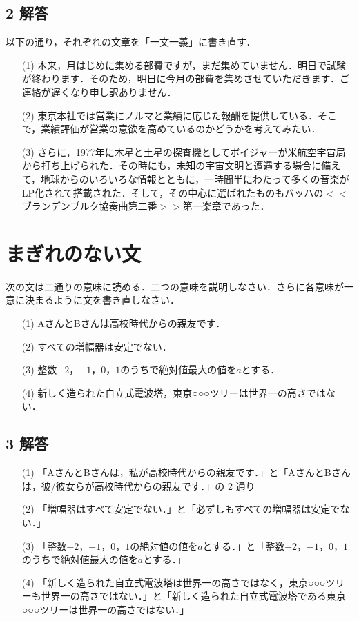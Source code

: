 \documentclass[11pt, a4paper]{jsarticle}
\begin{document}
\subsection*{2 解答}

以下の通り，それぞれの文章を「一文一義」に書き直す．

\begin{itemize}
    \item[(1)] 本来，月はじめに集める部費ですが，まだ集めていません．明日で試験が終わります．そのため，明日に今月の部費を集めさせていただきます．ご連絡が遅くなり申し訳ありません．
    \item[(2)] 東京本社では営業にノルマと業績に応じた報酬を提供している．そこで，業績評価が営業の意欲を高めているのかどうかを考えてみたい．
    \item[(3)] さらに，1977年に木星と土星の探査機としてボイジャーが米航空宇宙局から打ち上げられた．その時にも，未知の宇宙文明と遭遇する場合に備えて，地球からのいろいろな情報とともに，一時間半にわたって多くの音楽がLP化されて搭載された．そして，その中心に選ばれたものもバッハの$<<$ブランデンブルク協奏曲第二番$>>$第一楽章であった．
\end{itemize}

\newpage
\section{まぎれのない文}
次の文は二通りの意味に読める．二つの意味を説明しなさい．さらに各意味が一意に決まるように文を書き直しなさい．
\begin{itemize}
    \item[(1)] AさんとBさんは高校時代からの親友です．
    \item[(2)] すべての増幅器は安定でない．
    \item[(3)] 整数$-2$，$-1$，$0$，$1$のうちで絶対値最大の値を$a$とする．
    \item[(4)] 新しく造られた自立式電波塔，東京○○○ツリーは世界一の高さではない．
\end{itemize}
\subsection*{3 解答}

\begin{itemize}
    \item[(1)] 「AさんとBさんは，私が高校時代からの親友です．」と「AさんとBさんは，彼/彼女らが高校時代からの親友です．」の 2 通り
    \item[(2)] 「増幅器はすべて安定でない．」と「必ずしもすべての増幅器は安定でない．」
    \item[(3)] 「整数$-2$，$-1$，$0$，$1$の絶対値の値を$a$とする．」と「整数$-2$，$-1$，$0$，$1$のうちで絶対値最大の値を$a$とする．」
    \item[(4)] 「新しく造られた自立式電波塔は世界一の高さではなく，東京○○○ツリーも世界一の高さではない．」と「新しく造られた自立式電波塔である東京○○○ツリーは世界一の高さではない．」
\end{itemize}
\end{document}
